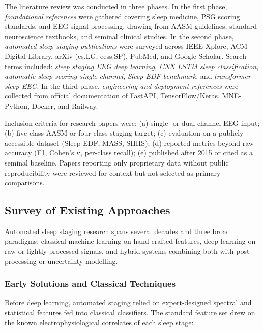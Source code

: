 \documentclass[10pt]{article}
\begin{document}
The literature review was conducted in three phases. In the first phase, \textit{foundational references} were gathered covering sleep medicine, PSG scoring standards, and EEG signal processing, drawing from AASM guidelines, standard neuroscience textbooks, and seminal clinical studies. In the second phase, \textit{automated sleep staging publications} were surveyed across IEEE Xplore, ACM Digital Library, arXiv (cs.LG, eess.SP), PubMed, and Google Scholar. Search terms included: \textit{sleep staging EEG deep learning}, \textit{CNN LSTM sleep classification}, \textit{automatic sleep scoring single-channel}, \textit{Sleep-EDF benchmark}, and \textit{transformer sleep EEG}. In the third phase, \textit{engineering and deployment references} were collected from official documentation of FastAPI, TensorFlow/Keras, MNE-Python, Docker, and Railway.

Inclusion criteria for research papers were: (a) single- or dual-channel EEG input; (b) five-class AASM or four-class staging target; (c) evaluation on a publicly accessible dataset (Sleep-EDF, MASS, SHHS); (d) reported metrics beyond raw accuracy (F1, Cohen's $\kappa$, per-class recall); (e) published after 2015 or cited as a seminal baseline. Papers reporting only proprietary data without public reproducibility were reviewed for context but not selected as primary comparisons.

\subsection{Survey of Existing Approaches}
\label{sec:survey}

Automated sleep staging research spans several decades and three broad paradigms: classical machine learning on hand-crafted features, deep learning on raw or lightly processed signals, and hybrid systems combining both with post-processing or uncertainty modelling.

\subsubsection{Early Solutions and Classical Techniques}
\label{sec:early}

Before deep learning, automated staging relied on expert-designed spectral and statistical features fed into classical classifiers. The standard feature set drew on the known electrophysiological correlates of each sleep stage:
\end{document}
